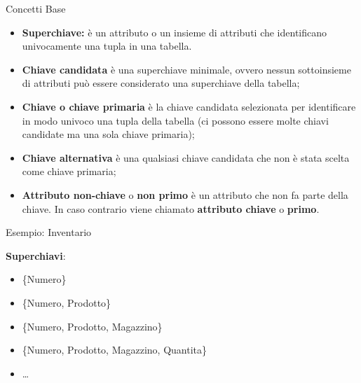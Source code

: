 %
\begin{frame}{Concetti Base}
    \begin{itemize}[<+->]
        \item \textbf{Superchiave:} \`e un attributo o un insieme di attributi che identificano univocamente una tupla in una tabella.
        \item \textbf{Chiave candidata} \`e una superchiave minimale, ovvero nessun sottoinsieme di attributi pu\`o essere considerato una superchiave della tabella;
        \item \textbf{Chiave o chiave primaria} \`e la chiave candidata selezionata per identificare in modo univoco una tupla della tabella (ci possono essere molte chiavi candidate ma una sola chiave primaria);
        \item \textbf{Chiave alternativa} \`e una qualsiasi chiave candidata che non \`e stata scelta come chiave primaria;
        \item \textbf{Attributo non-chiave} o \textbf{non primo} \`e un attributo che non fa parte della chiave. In caso contrario viene chiamato \textbf{attributo chiave} o \textbf{primo}.
    \end{itemize}
\end{frame}
%
\begin{frame}{Esempio: Inventario}
\vspace{-1cm}
\begin{center}
    \InventarioModified
\end{center}
\pause
\textbf{Superchiavi}:
\pause
\begin{itemize}[<+->]
    \item \{Numero\}
    \item \{Numero, Prodotto\}
    \item \{Numero, Prodotto, Magazzino\}
    \item \{Numero, Prodotto, Magazzino, Quantita\}
    \item \ldots
\end{itemize}
\end{frame}
